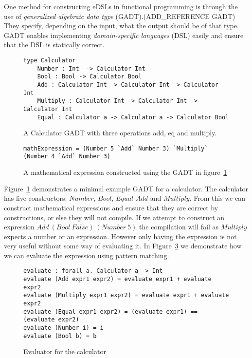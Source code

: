 One method for constructing eDSLs in functional programming is through the use
of \textit{generalized algebraic data type} (GADT).(ADD\_REFERENCE GADT)  They
specify, depending on the input, what the output should be of that type. GADT
enables implementing \textit{domain-specific languages} (DSL) easily and ensure
that the DSL is statically correct. 

\begin{figure}[H]
    \begin{lstlisting}
type Calculator 
    Number : Int  -> Calculator Int
    Bool : Bool -> Calculator Bool
    Add : Calculator Int -> Calculator Int -> Calculator Int
    Multiply : Calculator Int -> Calculator Int -> Calculator Int
    Equal : Calculator a -> Calculator a -> Calculator Bool
    \end{lstlisting}
    \caption{A Calculator GADT with three operations add, eq and multiply.}
    \label{gadtcalculator}
\end{figure}

\begin{figure}[H]
    \begin{lstlisting}
mathExpression = (Number 5 `Add` Number 3) `Multiply` (Number 4 `Add` Number 3)
    \end{lstlisting}
    \caption{A mathematical expression constructed using the GADT in
    figure~\ref{gadtcalculator}}
    \label{mathexpressiongadt}
\end{figure}


Figure~\ref{gadtcalculator} demonstrates a minimal example GADT for a
calculator. The calculator has five constructors: $Number$, $Bool$, $Equal$
$Add$ and $Multiply$. From this we can construct mathematical expressions and
ensure that they are correct by constructions, or else they will not compile.
If we attempt to construct an expression $Add\ (Bool\ False)\ (Number\ 5)$ the
compilation will fail as $Multiply$ expects a number or an expression. However
only having the expression is not very useful without some way of evaluating it.
In Figure~\ref{calculator} we demonstrate how we can evaluate the expression
using pattern matching.

\begin{figure}[H]
    \begin{lstlisting}
evaluate : forall a. Calculator a -> Int
evaluate (Add expr1 expr2) = evaluate expr1 + evaluate expr2
evaluate (Multiply expr1 expr2) = evaluate expr1 + evaluate expr2
evaluate (Equal expr1 expr2) = (evaluate expr1) == (evaluate expr2)
evaluate (Number i) = i
evaluate (Bool b) = b
    \end{lstlisting}
    \caption{Evaluator for the calculator}
    \label{calculator}
\end{figure}

